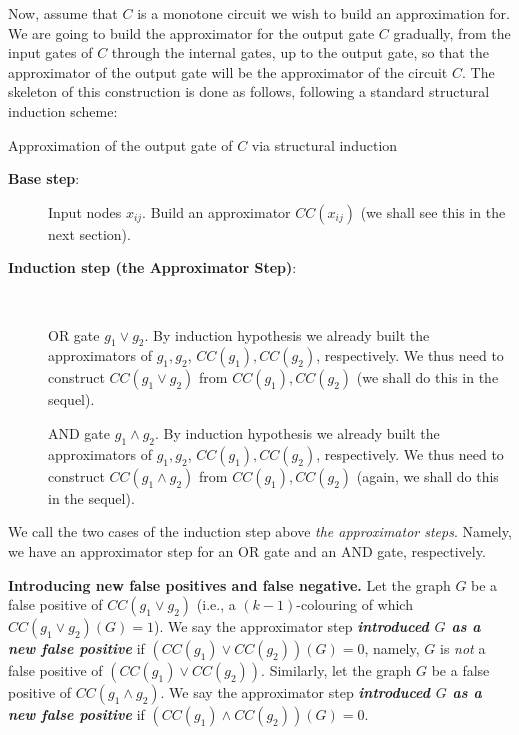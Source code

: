  

Now, assume that $C$ is a monotone circuit we wish to build an approximation for. We are going to build the approximator for the output gate $C$ gradually, from the input gates of $C$  through the internal gates, up to the output gate, so that the approximator of the output gate will be the approximator of the circuit $C$. The skeleton of this construction is done as follows, following a standard structural induction scheme:

\begin{trailer}
{Approximation of the output gate of $C$ via structural induction}

\begin{description}
\item[\textbf{Base step}:] 
Input nodes $x_{ij}$. Build an approximator $CC(x_{ij})$ (we shall see this in the next section).

\item[\textbf{Induction step (the Approximator Step)}:]
\

 OR gate $g_1\lor g_2$. By induction hypothesis we already built the approximators of $g_1,g_2$, $CC(g_1),CC(g_2)$, respectively. We thus need to construct $CC(g_1\lor g_2)$ from $CC(g_1),CC(g_2)$ (we shall do this in the sequel).

 AND gate $g_1\land g_2$. 
By induction hypothesis we already built the approximators 
of $g_1,g_2$, $CC(g_1),CC(g_2)$, respectively. 
We thus need to construct $CC(g_1\land g_2)$ from 
$CC(g_1),CC(g_2)$ (again, we shall do this in the sequel).
\end{description} 
\end{trailer}

 We call the two cases of the induction step above \emph{the approximator steps}. Namely, we have an approximator step for an OR gate and an AND gate, respectively. 


\begin{tcolorbox}[colframe=white, colback=blue!11, boxrule=0mm, sharp corners]
\textbf{Introducing new false positives and false negative.}
Let the graph $G$ be a false positive of $CC(g_1\lor g_2)$ (i.e., a $(k-1)$-colouring of which $CC(g_1\lor g_2)(G)=1$).
We say the approximator step \emph{\textbf{introduced $G$ as a new false positive}} if $(CC(g_1)\lor CC(g_2))(G)=0$, namely, $G$ is \emph{not} a false positive of $(CC(g_1)\lor CC(g_2))$.
Similarly, let the graph $G$ be a false positive of $CC(g_1\land g_2)$. We say the approximator step \textbf{\emph{introduced $G$ as a new false positive}} if $(CC(g_1)\land CC(g_2))(G)=0$.
\end{tcolorbox}

